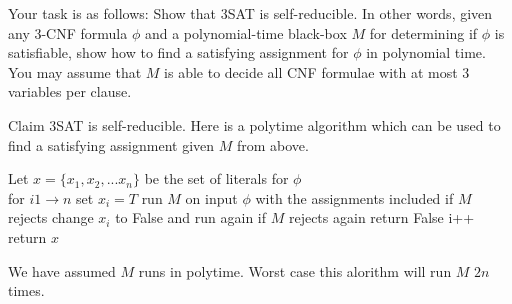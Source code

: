 \documentclass{article}
\begin{document}
\begin{enumerate}
Your task is as follows: Show that 3SAT is self-reducible. In other words, given any 3-CNF formula $\phi$ and a polynomial-time black-box $M$ for determining if $\phi$ is satisfiable, show how to find a satisfying assignment for $\phi$ in polynomial time. You may assume that $M$ is able to decide all CNF formulae with {at most} 3 variables per clause.
\end{enumerate}

Claim 3SAT is self-reducible. Here is a polytime algorithm which can be used to find a satisfying assignment given $M$ from above.

Let $x = \{x_1, x_2, ... x_n\}$ be the set of literals for $\phi$\\

for $i 1 \rightarrow n$
\hspace{10mm}set $x_i = T$
\hspace{10mm}run $M$ on input $\phi$ with the assignments included
\hspace{10mm}if $M$ rejects change $x_i$ to False and run again
\hspace{20mm}if $M$ rejects again return False
\hspace{10mm}i++
return $x$

We have assumed $M$ runs in polytime. Worst case this alorithm will run $M$ $2n$ times.
\end{document}

